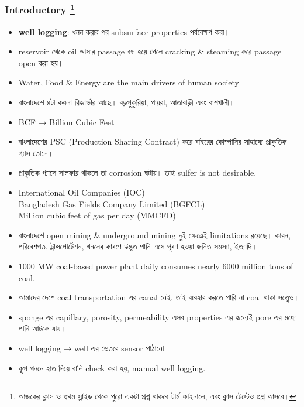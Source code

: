 \documentclass{article}
\begin{document}
\subsubsection*{Introductory \footnote{{\bengalifont আজকের ক্লাস ও প্রথম স্লাইড থেকে পুরো একটা প্রশ্ন থাকবে টার্ম ফাইনালে, এবং ক্লাস টেস্টেও প্রশ্ন আসবে। }}}
\begin{itemize}
    \item \textbf{well logging}: {\bengalifont খনন করার পর subsurface properties পর্যবেক্ষণ করা। }
    \item {\bengalifont reservoir থেকে oil আসার passage বন্ধ হয়ে গেলে cracking \& steaming করে passage open করা হয়। }
    \item Water, Food \& Energy are the main drivers of human society
    \item {\bengalifont বাংলাদেশে ৪টা কয়লা রিজার্ভার আছে। বড়পুকুরিয়া, পায়রা, আতাবাড়ী এবং বাশখালী। }
    \item BCF → Billion Cubic Feet
    \item {\bengalifont বাংলাদেশের PSC (Production Sharing Contract) করে বাইরের কোম্পানির সাহায্যে প্রাকৃতিক গ্যাস তোলে। }
    \item {\bengalifont প্রাকৃতিক গ্যাসে সালফার থাকলে তা corrosion ঘটায়। তাই sulfer is not desirable.}
    \item International Oil Companies (IOC)\\ Bangladesh Gas Fields Company Limited (BGFCL)\\ Million cubic feet of gas per day (MMCFD)
    \item {\bengalifont বাংলাদেশে open mining \& underground mining দুই ক্ষেত্রেই limitations রয়েছে। কারন, পরিবেশগত, ট্রান্সপোর্টেশন, খননের কারণে উদ্ভুত পানি এসে পূরণ হওয়া জনিত সমস্যা, ইত্যাদি। }
    \item 1000 MW coal-based power plant daily consumes nearly 6000 million tons of coal. 
    \item {\bengalifont আমাদের দেশে coal transportation এর canal নেই, তাই ব্যবহার করতে পারি না coal থাকা সত্ত্বেও। }
    \item {\bengalifont sponge এর capillary, porosity, permeability এসব properties এর জন্যেই pore এর মধ্যে পানি আটকে যায়। }
    \item {\bengalifont well logging → well এর ভেতরে sensor পাঠানো}
    \item {\bengalifont কূপ খননে হাত দিয়ে বালি check করা হয়, manual well logging. }
\end{itemize}

\newpage
\end{document}
